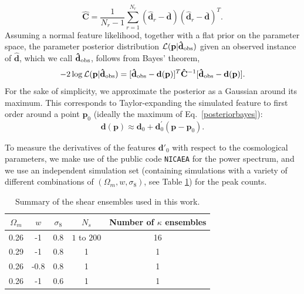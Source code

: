 \documentclass[reprint,aps,prd,superscriptaddress,showkeys,showpacs]{revtex4-1}
\newcommand{\bb}[1]{\mathbf{#1}}
\newcommand{\bbh}[1]{\mathbf{\hat{#1}}}
\begin{document}
\begin{equation}
\label{covest}
\bbh{C} = \frac{1}{N_r-1}\sum_{r=1}^{N_r} (\bbh{d}_r - \bar{\bb{d}}) (\bbh{d}_r - \bar{\bb{d}})^T.
\end{equation}
%
Assuming a normal feature likelihood, together with a flat prior on
the parameter space, the parameter posterior distribution
$\mathcal{L}(\bb{p}\vert\bbh{d}_{\rm obs})$ given an observed instance of
$\bbh{d}$, which we call $\bbh{d}_{\rm obs}$, follows from Bayes' theorem,
%
\begin{equation}
\label{posteriorbayes}
-2\log\mathcal{L}(\bb{p}\vert\bbh{d}_{\rm obs}) = [\bbh{d}_{\rm obs}-\bb{d}(\bb{p})]^T\bbh{C}^{-1}[\bbh{d}_{\rm obs}-\bb{d}(\bb{p})].
\end{equation}
%
For the sake of simplicity, we approximate the posterior as a Gaussian
around its maximum. This corresponds to Taylor-expanding the simulated
feature to first order around a point $\bb{p}_0$ (ideally the maximum
of Eq.~\ref{posteriorbayes}):
%
\begin{equation}
\bb{d}(\bb{p}) \approx \bb{d}_0 + \bb{d}_0^\prime(\bb{p}-\bb{p}_0).
\end{equation}
%

To measure the derivatives of the features $\bb{d}'_0$ with respect to
the cosmological parameters, we make use of the public code
\texttt{NICAEA} \citep{Nicaea} for the power spectrum, and we use an
independent simulation set (containing simulations with a variety of
different combinations of $(\Omega_m,w,\sigma_8)$, see Table
\ref{simtable}) for the peak counts.

\begin{table}
\begin{center}
\begin{tabular}{c|c|c||c|c}
\toprule
$\Omega_m$ &  $w$ & $\sigma_8$ & $N_s$ & Number of $\kappa$ ensembles \\ \hline \hline
\midrule
%
0.26 & -1 & 0.8 & $1$ to $200$ & 16 \\
0.29 & -1 & 0.8 & 1 & 1 \\
0.26 & -0.8 & 0.8 & 1 & 1 \\
0.26 & -1 & 0.6 & 1 & 1 \\
%
\bottomrule
\end{tabular}
\end{center}
\caption{Summary of the shear ensembles used in this work.}
\label{simtable}
\end{table}
\end{document}
